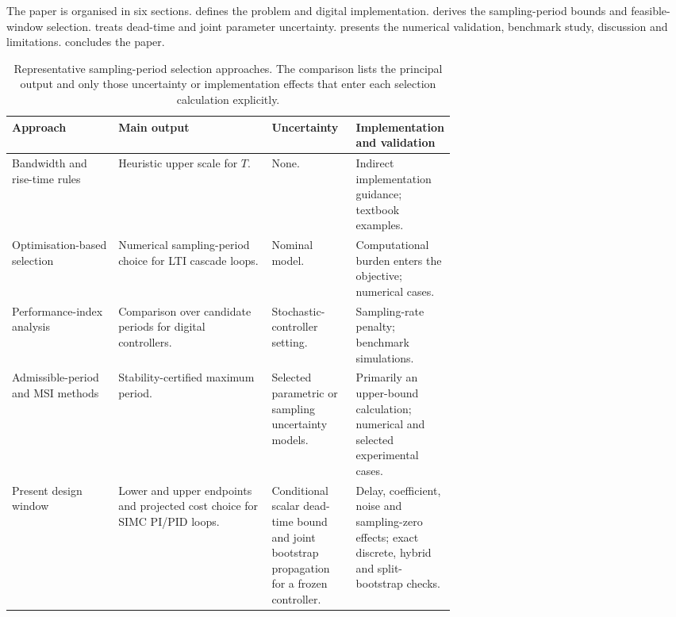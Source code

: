 \documentclass[a4paper,fleqn]{cas-sc}
\theoremstyle{remark}
\begin{document}
The paper is organised in six sections.  defines the problem and digital implementation.  derives the sampling-period bounds and feasible-window selection.  treats dead-time and joint parameter uncertainty.  presents the numerical validation, benchmark study, discussion and limitations.  concludes the paper.

\begin{table}[pos=!htb]
\caption{Representative sampling-period selection approaches. The comparison
lists the principal output and only those uncertainty or implementation effects
that enter each selection calculation explicitly.}
\label{tab:compare}
\renewcommand{\arraystretch}{1.12}
\begin{tabularx}{\linewidth}{@{}>{\raggedright\arraybackslash}p{0.24\linewidth}>{\raggedright\arraybackslash}X>{\raggedright\arraybackslash}p{0.19\linewidth}>{\raggedright\arraybackslash}p{0.22\linewidth}@{}}
\toprule
Approach & Main output & Uncertainty & Implementation and validation \\
\midrule
Bandwidth and rise-time rules \citep{astrom1997computer,isermann1989digital}
& Heuristic upper scale for $T$.
& None.
& Indirect implementation guidance; textbook examples. \\
Optimisation-based selection \citep{susca2023sampling}
& Numerical sampling-period choice for LTI cascade loops.
& Nominal model.
& Computational burden enters the objective; numerical cases. \\
Performance-index analysis \citep{araujo2024samplingperiod}
& Comparison over candidate periods for digital controllers.
& Stochastic-controller setting.
& Sampling-rate penalty; benchmark simulations. \\
Admissible-period and MSI methods \citep{hetel2017recent,wang2025impulsive}
& Stability-certified maximum period.
& Selected parametric or sampling uncertainty models.
& Primarily an upper-bound calculation; numerical and selected experimental cases. \\
Present design window
& Lower and upper endpoints and projected cost choice for SIMC PI/PID loops.
& Conditional scalar dead-time bound and joint bootstrap propagation for a frozen controller.
& Delay, coefficient, noise and sampling-zero effects; exact discrete, hybrid and split-bootstrap checks. \\
\bottomrule
\end{tabularx}
\end{table}
\end{document}
